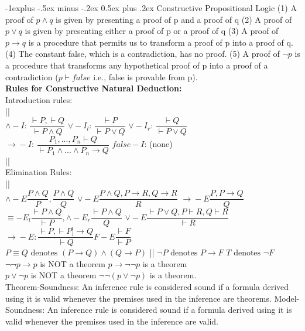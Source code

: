 \documentclass[letterpaper, 8pt]{extarticle}
\makeatletter
\renewcommand{\subsection}{\@startsection{subsection}{2}{0mm}%
                                {-1explus -.5ex minus -.2ex}%
                                {0.5ex plus .2ex}%
                                {\normalfont\small\bfseries}}
\makeatother
\begin{document}
\begin{multicols*}{3}
    \subsection{Constructive Propositional Logic}
    (1) A proof of $p \land q$ is given by presenting a proof of p and a
    proof of q (2) A proof of $p \lor q$ is given by presenting either a proof of p or a proof of q (3) A proof of $p \xrightarrow{} q$ is a procedure that permits us to transform a proof of p into a proof of q. (4) The constant false, which is a contradiction, has no proof. (5) A proof of $\neg p$ is a procedure that transforms any hypothetical proof of p into a proof of a contradiction ($p \vdash false$ i.e., false is provable from p).\\
    \textbf{Rules for Constructive Natural Deduction:}\\
    Introduction rules: \\
    ||\\
    $\land-I$: $\dfrac{\vdash P, \vdash Q}{\vdash P \land Q}$ $\lor-I_l$: $\dfrac{\vdash P}{\vdash P \lor Q}$ $\lor-I_r$: $\dfrac{\vdash Q}{\vdash P \lor Q}$\\
    $\xrightarrow{}-I$: $\dfrac{P_1,...,P_n \vdash Q}{\vdash P_1 \land ... \land P_n \rightarrow Q}$ $false-I$: (none)\\
    ||\\
    Elimination Rules:\\
    ||\\
    $\land-E \dfrac{P \land Q}{P}, \dfrac{P \land Q}{Q}$ $\lor-E \dfrac{P \land Q, P \xrightarrow{} R, Q \xrightarrow{} R}{R}$ $\xrightarrow{}-E \dfrac{P, P \xrightarrow{} Q}{Q}$\\
    $\equiv-E_l \dfrac{\vdash P \land Q}{\vdash P}, \land-E_r \dfrac{\vdash P \land Q}{Q}$ $\lor-E \dfrac{\vdash P \lor Q, P \vdash R, Q \vdash R}{\vdash R}$ $\xrightarrow{}-E: \dfrac{\vdash P, \vdash P ]\xrightarrow{} Q}{\vdash Q} F-E \dfrac{\vdash F}{\vdash P}$\\
    $P \equiv Q \text{ denotes } (P \xrightarrow{} Q) \land (Q \xrightarrow{} P) $ || $\neg P \text{ denotes } P \xrightarrow{} F$ $T \text{ denotes } \neg F$\\
    $\neg \neg p \xrightarrow{} p $ is NOT a theorem $p \xrightarrow{} \neg \neg p $ is a theorem \\ $p \lor \neg p $ is NOT a theorem $\neg \neg (p \lor \neg p)$ is a theorem.\\
    Theorem-Soundness: An inference rule is considered sound if a formula derived using it is valid whenever the premises used in the inference are theorems. Model-Soundness: An inference rule is considered sound if a
    formula derived using it is valid whenever the premises used in the inference are valid.\\


\end{multicols*}
\end{document}

